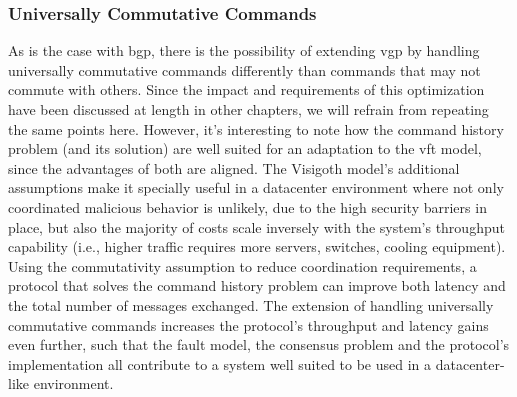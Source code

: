 \subsubsection{Universally Commutative Commands}
As is the case with \acrlong{bgp}, there is the possibility of extending \acrshort{vgp} by handling universally commutative commands differently than commands that may not commute with others. Since the impact and requirements of this optimization have been discussed at length in other chapters, we will refrain from repeating the same points here. However, it's interesting to note how the command history problem (and its solution) are well suited for an adaptation to the \acrshort{vft} model, since the advantages of both are aligned. The Visigoth model's additional assumptions make it specially useful in a datacenter environment where not only coordinated malicious behavior is unlikely, due to the high security barriers in place, but also the majority of costs scale inversely with the system's throughput capability (i.e., higher traffic requires more servers, switches, cooling equipment). Using the commutativity assumption to reduce coordination requirements, a protocol that solves the command history problem can improve both latency and the total number of messages exchanged. The extension of handling universally commutative commands increases the protocol's throughput and latency gains even further, such that the fault model, the consensus problem and the protocol's implementation all contribute to a system well suited to be used in a datacenter-like environment.
